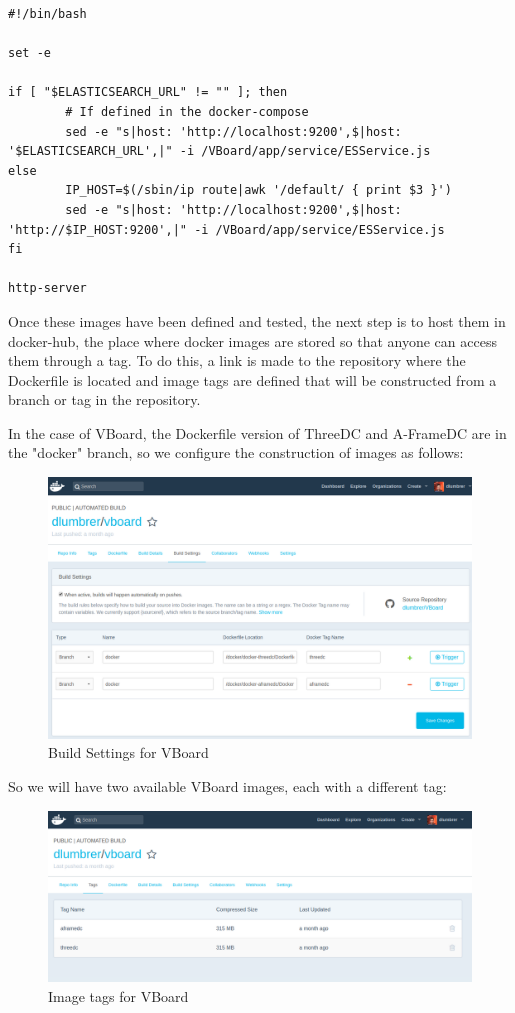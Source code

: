\documentclass[a4paper, 12pt]{book}
\begin{document}
\begin{lstlisting}[frame=single]
#!/bin/bash

set -e

if [ "$ELASTICSEARCH_URL" != "" ]; then
        # If defined in the docker-compose
        sed -e "s|host: 'http://localhost:9200',$|host: '$ELASTICSEARCH_URL',|" -i /VBoard/app/service/ESService.js
else
        IP_HOST=$(/sbin/ip route|awk '/default/ { print $3 }')
        sed -e "s|host: 'http://localhost:9200',$|host: 'http://$IP_HOST:9200',|" -i /VBoard/app/service/ESService.js
fi

http-server
\end{lstlisting}

Once these images have been defined and tested, the next step is to host them in docker-hub, the place where docker images are stored so that anyone can access them through a tag. To do this, a link is made to the repository where the Dockerfile is located and image tags are defined that will be constructed from a branch or tag in the repository.

In the case of VBoard, the Dockerfile version of ThreeDC and A-FrameDC are in the "docker" branch, so we configure the construction of images as follows:

\begin{figure}[H]
  \centering
  \includegraphics[width=16cm, keepaspectratio]{img/development/docker-hub-0}
  \caption{Build Settings for VBoard}
  \label{fig:examplestandalone}
\end{figure}

So we will have two available VBoard images, each with a different tag:

\begin{figure}[H]
  \centering
  \includegraphics[width=16cm, keepaspectratio]{img/development/dockerhub}
  \caption{Image tags for VBoard}
  \label{fig:examplestandalone}
\end{figure}
\end{document}
